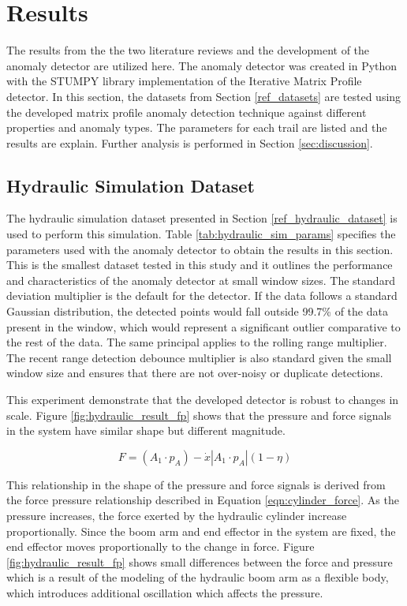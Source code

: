 \section{Results}
\label{ref_results}

The results from the the two literature reviews and the development of the anomaly detector are utilized here. The anomaly detector was created in Python with the STUMPY library implementation of the Iterative Matrix Profile detector. In this section, the datasets from Section \ref{ref_datasets} are tested using the developed matrix profile anomaly detection technique against different properties and anomaly types. The parameters for each trail are listed and the results are explain. Further analysis is performed in Section \ref{sec:discussion}.

\subsection{Hydraulic Simulation Dataset}
\label{ref_results_hydraulic_sim}
The hydraulic simulation dataset presented in Section \ref{ref_hydraulic_dataset} is used to perform this simulation. Table \ref{tab:hydraulic_sim_params} specifies the parameters used with the anomaly detector to obtain the results in this section. This is the smallest dataset tested in this study and it outlines the performance and characteristics of the anomaly detector at small window sizes. The standard deviation multiplier is the default for the detector. If the data follows a standard Gaussian distribution, the detected points would fall outside 99.7\% of the data present in the window, which would represent a significant outlier comparative to the rest of the data. The same principal applies to the rolling range multiplier. The recent range detection debounce multiplier is also standard given the small window size and ensures that there are not over-noisy or duplicate detections.

This experiment demonstrate that the developed detector is robust to changes in scale. Figure \ref{fig:hydraulic_result_fp} shows that the pressure and force signals in the system have similar shape but different magnitude. 

\begin{equation}
    \label{eqn:cylinder_force}
    F = (A_1 \cdot p_A) - \dot{x}  | A_1 \cdot p_A | (1 - \eta)
\end{equation}

This relationship in the shape of the pressure and force signals is derived from the force pressure relationship described in Equation \ref{eqn:cylinder_force}. As the pressure increases, the force exerted by the hydraulic cylinder increase proportionally. Since the boom arm and end effector in the system are fixed, the end effector moves proportionally to the change in force. Figure \ref{fig:hydraulic_result_fp} shows small differences between the force and pressure which is a result of the modeling of the hydraulic boom arm as a flexible body, which introduces additional oscillation which affects the pressure.


